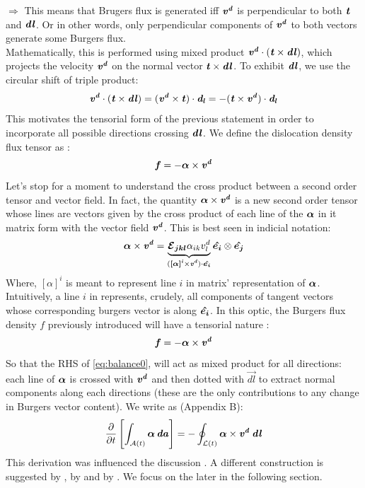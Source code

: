\documentclass{article}
\begin{document}
$\bm{\Rightarrow}$ This means that Brugers flux is generated iff $\bm{\mathit{v^d}}$ is perpendicular to both $\bm{\mathit{t}}$ and $\bm{\mathit{dl}}$. Or in other words, only perpendicular components of $\bm{\mathit{v^d}}$ to both vectors generate some Burgers flux.\\

Mathematically, this is performed using mixed product $\bm{\mathit{v^d}}\cdot (\bm{\mathit{t}} \times \bm{\mathit{dl}}) $, which projects the velocity $\bm{\mathit{v^d}}$ on the normal vector $\bm{\mathit{t}} \times \bm{\mathit{dl}}$. To exhibit $\bm{\mathit{dl}}$, we use the circular shift of triple product:
\begin{equation}
\bm{\mathit{v^d}}\cdot (\bm{\mathit{t}} \times \bm{\mathit{dl}}) =  (\bm{\mathit{v^d}}\times \bm{\mathit{t}})\cdot \bm{\mathit{d_l}} = -( \bm{\mathit{t}} \times \bm{\mathit{v^d}})\cdot \bm{\mathit{d_l}}
\end{equation}
This motivates the tensorial form of the previous statement in order to incorporate all possible directions crossing $\bm{\mathit{dl}}$. We define the dislocation density flux tensor as :
\begin{equation}
    \bm{\mathit{f}} = - \bm{\mathit{\alpha}} \times \bm{\mathit{v^d}}
\end{equation}
Let's stop for a moment to understand the cross product between a second order tensor and vector field. In fact, the quantity $\bm{\mathit{\alpha}} \times \bm{\mathit{v^d}}$ is a new second order tensor whose lines are vectors given by the cross product of each line of the $\bm{\mathit{\alpha}}$ in it matrix form with the vector field $\bm{\mathit{v^d}}$. This is best seen in indicial notation:
\begin{equation}
    \bm{\mathit{\alpha}} \times \bm{\mathit{v^d}} = \underbrace{{\bm{\mathcal{E}_{jkl}}} \alpha_{ik} v^d_{l} }_{(\bm{\mathit{[\alpha]^i}} \times \bm{\mathit{v^d}})\cdot \bm{\hat{e_{i}}}}\bm{\hat{e_{i}}} \otimes \bm{\hat{e_{j}}}
\end{equation}
Where, $[\alpha]^i$ is meant to represent line $i$ in matrix' representation of $\bm{\mathit{\alpha}}$. Intuitively, a line $i$ in  represents, crudely, all components of tangent vectors whose corresponding burgers vector is along $\bm{\hat{e_{i}}}$. In this optic, the Burgers flux density $f$ previously introduced will have a tensorial nature :
\begin{equation}
    \bm{\mathit{f}}= -\bm{\mathit{\alpha}} \times \bm{\mathit{v^d}}
\end{equation}
So that the RHS of \cref{eq:balance0}, will act as mixed product for all directions: each line of $\bm{\mathit{\alpha}}$ is crossed with $\bm{\mathit{v^d}}$ and then dotted with $\vec{dl}$ to extract normal components along each directions (these are the only contributions to any change in Burgers vector content). We write as \parencite{acharyaMicrocanonicalEntropy2011} (Appendix B):
\begin{equation}
    \frac{\partial}{\partial t}\left[ \int_{\mathcal{A}(t)} \bm{\mathit{\alpha}}\,\bm{\mathit{da}} \right] = - \oint_{\mathcal{L}(t)} \bm{\mathit{\alpha}}\times \bm{\mathit{v^d}} \:\bm{\mathit{dl}}
\end{equation}
This derivation was influenced the discussion \parencite{fressengeasMechanicsdislocation2017}.
A different construction is suggested by \parencite{muraContinuousdistribution1963}, by \parencite{foxContinuumTheory1966} and by \parencite{kosevichDYNAMICALTHEORY}. We focus on the later in the following section.
\end{document}
